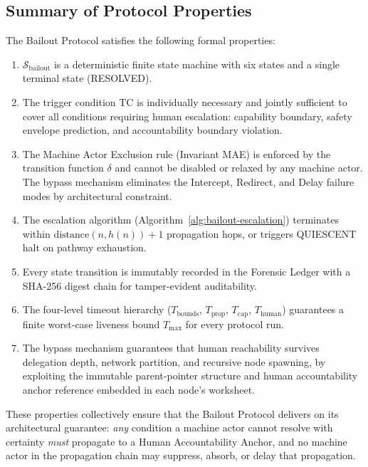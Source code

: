 
\subsection{Summary of Protocol Properties}\label{sec:bailout-summary}

The Bailout Protocol satisfies the following formal properties:

\begin{enumerate}\itemsep=0pt
\item $\mathcal{S}_{\text{bailout}}$ is a deterministic finite state machine
  with six states and a single terminal state (RESOLVED).

\item The trigger condition TC is individually necessary and jointly sufficient
  to cover all conditions requiring human escalation: capability boundary,
  safety envelope prediction, and accountability boundary violation.

\item The Machine Actor Exclusion rule (Invariant MAE) is enforced by the
  transition function $\delta$ and cannot be disabled or relaxed by any
  machine actor. The bypass mechanism eliminates the Intercept, Redirect,
  and Delay failure modes by architectural constraint.

\item The escalation algorithm (Algorithm~\ref{alg:bailout-escalation})
  terminates within $\text{distance}(n, h(n)) + 1$ propagation hops, or triggers
  QUIESCENT halt on pathway exhaustion.

\item Every state transition is immutably recorded in the Forensic Ledger
  with a SHA-256 digest chain for tamper-evident auditability.

\item The four-level timeout hierarchy ($T_{\text{bounds}}$,
  $T_{\text{prop}}$, $T_{\text{cap}}$, $T_{\text{human}}$) guarantees a
  finite worst-case liveness bound $T_{\max}$ for every protocol run.

\item The bypass mechanism guarantees that human reachability survives
  delegation depth, network partition, and recursive node spawning, by
  exploiting the immutable parent-pointer structure and human accountability
  anchor reference embedded in each node's worksheet.
\end{enumerate}

These properties collectively ensure that the Bailout Protocol delivers on
its architectural guarantee: \emph{any} condition a machine actor cannot
resolve with certainty \emph{must} propagate to a Human Accountability
Anchor, and no machine actor in the propagation chain may suppress,
absorb, or delay that propagation.
